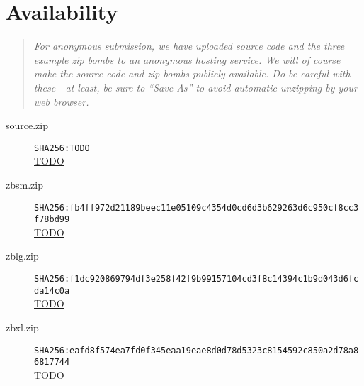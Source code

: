 \documentclass[letterpaper,twocolumn,10pt]{article}
\begin{document}


\section*{Availability}

\begin{quote}
\sl
For anonymous submission,
we have uploaded source code
and the three example zip bombs
to an anonymous hosting service.
We will of course make the source code
and zip bombs publicly available.
Do be careful with these---at least,
be sure to ``Save As''
to avoid automatic unzipping by your web browser.
\end{quote}

\begin{description}
\item[source.zip]
{\tiny\texttt{SHA256:TODO}}\\
\url{TODO}
\item[zbsm.zip]
{\tiny\texttt{SHA256:fb4ff972d21189beec11e05109c4354d0cd6d3b629263d6c950cf8cc3f78bd99}}\\
\url{TODO}
\item[zblg.zip]
{\tiny\texttt{SHA256:f1dc920869794df3e258f42f9b99157104cd3f8c14394c1b9d043d6fcda14c0a}}\\
\url{TODO}
\item[zbxl.zip]
{\tiny\texttt{SHA256:eafd8f574ea7fd0f345eaa19eae8d0d78d5323c8154592c850a2d78a86817744}}\\
\url{TODO}
\end{description}





\end{document}
